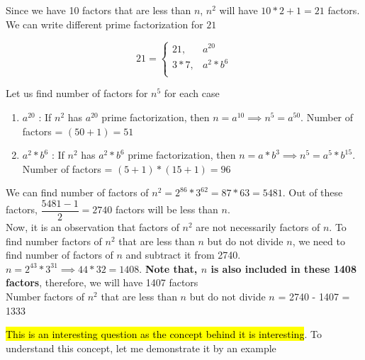 Since we have 10 factors that are less than $n$, $n^2$ will have $10 * 2 + 1 = 21$ factors. We can write different prime factorization for $21$

\begin{equation*}
    21 = 
    \begin{cases}
        21, & a^{20} \\
        3 * 7, & a^2 * b^6 \\
    \end{cases}
\end{equation*}

Let us find number of factors for $n^5$ for each case

\begin{enumerate}
    \item $a^{20}$ : If $n^2$ has $a^{20}$ prime factorization, then $n = a^{10} \implies n^5 = a^{50}$. Number of factors = $(50 + 1) = 51$

    \item $a^2 * b^6$ : If $n^2$ has $a^2 * b^6$ prime factorization, then $n = a * b^3 \implies n^5 = a^5 * b^15$. Number of factors = $(5 + 1) * (15 + 1) = 96$
\end{enumerate}


We can find number of factors of $n^2 = 2^{86} * 3^{62} = 87 * 63 = 5481$. Out of these factors, $\dfrac{5481 - 1}{2} = 2740$ factors will be less than $n$. \\

Now, it is an observation that factors of $n^2$ are not necessarily factors of $n$. To find number factors of $n^2$ that are less than $n$ but do not divide $n$, we need to find number of factors of $n$ and subtract it from 2740. \\

$n = 2^{43} * 3^{31} \implies 44 * 32 = 1408$. \textbf{Note that, $n$ is also included in these 1408 factors}, therefore, we will have 1407 factors \\

Number factors of $n^2$ that are less than $n$ but do not divide $n$ = 2740 - 1407 = 1333


\hl{This is an interesting question as the concept behind it is interesting}. To understand this concept, let me demonstrate it by an example

